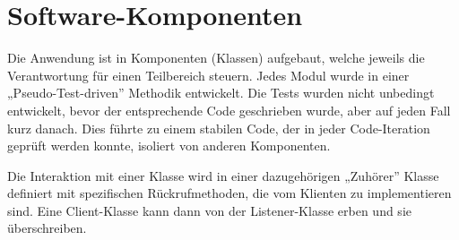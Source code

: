 \section{Software-Komponenten}

Die Anwendung ist in Komponenten (Klassen) aufgebaut, welche jeweils die Verantwortung für einen Teilbereich steuern. Jedes Modul wurde in einer „Pseudo-Test-driven” Methodik entwickelt. Die Tests wurden nicht unbedingt entwickelt, bevor der entsprechende Code geschrieben wurde, aber auf jeden Fall kurz danach. Dies führte zu einem stabilen Code, der in jeder Code-Iteration geprüft werden konnte, isoliert von anderen Komponenten.

Die Interaktion mit einer Klasse wird in einer dazugehörigen „Zuhörer” Klasse definiert mit spezifischen Rückrufmethoden, die vom Klienten zu implementieren sind. Eine Client-Klasse kann dann von der Listener-Klasse erben und sie überschreiben.